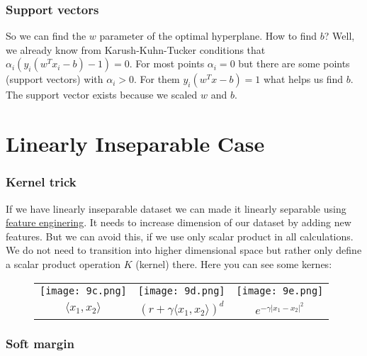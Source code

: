 \subsubsection*{Support vectors}

So we can find the $w$ parameter of the optimal hyperplane. How to find $b$? Well, we already know from Karush-Kuhn-Tucker conditions that $\alpha_i(y_i(w^Tx_i-b)-1)=0$. For most points $\alpha_i=0$ but there are some points (support vectors) with $\alpha_i>0$. For them $y_i(w^Tx-b)=1$ what helps us find $b$. The support vector exists because we scaled $w$ and $b$.

\pagebreak
\section{Linearly Inseparable Case}
\vspace{-0.6cm}
\subsubsection*{Kernel trick}

If we have linearly inseparable dataset we can made it linearly separable using \hyperlink{new_features}{feature enginering}. It needs to increase dimension of our dataset by adding new features. But we can avoid this, if we use only scalar product in all calculations. We do not need to transition into higher dimensional space but rather only
define a scalar product operation $K$ (kernel) there. Here you can see some kernes:\\
\begin{figure}[h]
  \centering
  \begin{tabular}{ccc}
    \texttt{[image: 9c.png]} & \hspace{0.5cm}
    \texttt{[image: 9d.png]} & \hspace{0.5cm}
    \texttt{[image: 9e.png]} \\
    $\langle x_1,x_2\rangle$ & $(r+\gamma\langle x_1,x_2\rangle)^d$ & $e^{-\gamma|x_1-x_2|^2}$ \\
  \end{tabular}
  \vspace{-0.8cm}
\end{figure}

\subsubsection*{Soft margin}


